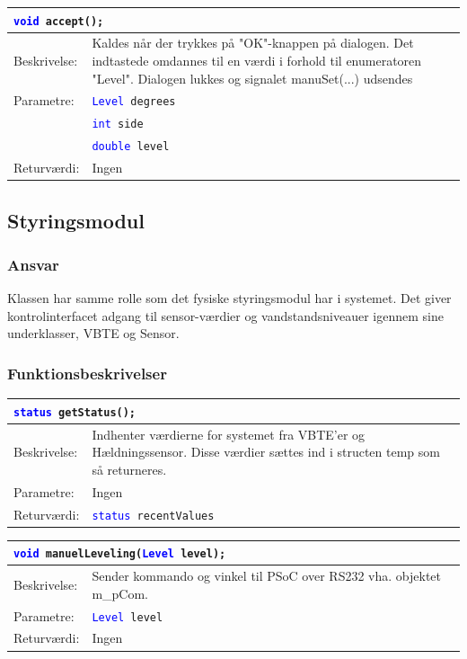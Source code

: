 \begin{table}[H]
\begin{tabular}{l p{12.5cm}}
\multicolumn{2}{l}{\texttt{\textcolor{blue}{void} accept();}} \\
\hline
Beskrivelse: &Kaldes når der trykkes på "OK"-knappen på dialogen. Det indtastede omdannes til en værdi i forhold til enumeratoren "Level". Dialogen lukkes og signalet manuSet(...) udsendes \\
Parametre:&\texttt{\textcolor{blue}{Level} degrees}\\
&\texttt{\textcolor{blue}{int} side}\\
&\texttt{\textcolor{blue}{double} level}\\
Returværdi:&Ingen\\
\end{tabular}
\end{table}

\subsection{Styringsmodul}
\subsubsection{Ansvar}
Klassen har samme rolle som det fysiske styringsmodul har i systemet. Det giver kontrolinterfacet adgang til sensor-værdier og vandstandsniveauer igennem sine underklasser, VBTE og Sensor.
\subsubsection{Funktionsbeskrivelser}

\begin{table}[H]
\begin{tabular}{l p{12.5cm}}
\multicolumn{2}{l}{\texttt{\textcolor{blue}{status} getStatus();}} \\
\hline
Beskrivelse: &Indhenter værdierne for systemet fra VBTE'er og Hældningssensor. Disse værdier sættes ind i structen temp som så returneres.\\
Parametre:&Ingen\\
Returværdi:&\texttt{\textcolor{blue}{status} recentValues}\\
\end{tabular}
\end{table}

\begin{table}[H]
\begin{tabular}{l p{12.5cm}}
\multicolumn{2}{l}{\texttt{\textcolor{blue}{void} manuelLeveling(\textcolor{blue}{Level} level);}} \\
\hline
Beskrivelse: &Sender kommando og vinkel til PSoC over RS232 vha. objektet m\_pCom.\\
Parametre:&\texttt{\textcolor{blue}{Level} level}\\
Returværdi:&Ingen\\
\end{tabular}
\end{table}


